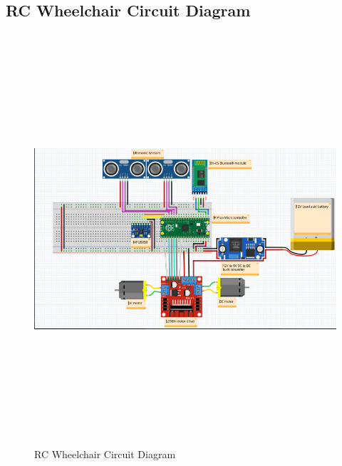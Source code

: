 \documentclass[conference]{IEEEtran}
\begin{document}
\newpage
\subsection{RC Wheelchair Circuit Diagram}
\begin{figure}[h]
    \centering
    \includegraphics[keepaspectratio, angle=90, height=6in]{figs/H/gerhortsDribblings.png}
    \caption{RC Wheelchair Circuit Diagram}
    \label{fig:circuit_diagram}
\end{figure}

\twocolumn
\end{document}
